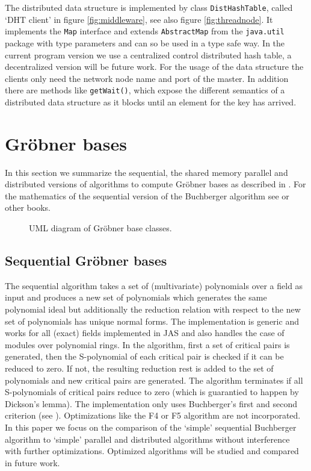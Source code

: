 \documentclass[10pt,twocolumn,a4paper]{article}
\newcommand{\code}[1]{\texttt{#1}}
\begin{document}
The distributed data structure is implemented by class
\code{Dist\-Hash\-Table}, called `DHT client' in figure
\ref{fig:middleware}, see also figure \ref{fig:threadnode}. It
implements the \code{Map} interface and extends \code{Abs\-tract\-Map}
from the \code{java.util} package with type parameters and can so be
used in a type safe way. In the current program version we use a
centralized control distributed hash table, a decentralized version
will be future work.  For the usage of the data structure the clients
only need the network node name and port of the master.  In addition
there are methods like \code{getWait()}, which expose the different
semantics of a distributed data structure as it blocks until an
element for the key has arrived.


\section{Gr\"obner bases} 

In this section we summarize the sequential, the shared memory
parallel and distributed versions of algorithms to compute Gr\"obner
bases as described in \cite{Kredel:2009,Kredel:2010}.  For the
mathematics of the sequential version of the Buchberger algorithm see
\cite{Becker:1993} or other books.


\begin{figure}[thb]
\centering
{}
\caption{UML diagram of Gr\"obner base classes.}
\label{fig:gbase}
\end{figure}


\subsection{Sequential Gr\"obner bases} 

The sequential algorithm takes a set of (multivariate) polynomials
over a field as input and produces a new set of polynomials which
generates the same polynomial ideal but additionally the reduction
relation with respect to the new set of polynomials has unique normal
forms.  The implementation is generic and works for all (exact) fields
implemented in JAS and also handles the case of modules over
polynomial rings.  In the algorithm, first a set of critical pairs is
generated, then the S-polynomial of each critical pair is checked if
it can be reduced to zero. If not, the resulting reduction rest is
added to the set of polynomials and new critical pairs are generated.
The algorithm terminates if all S-polynomials of critical pairs reduce
to zero (which is guarantied to happen by Dickson's lemma).  The
implementation only uses Buchberger's first and second criterion (see
\cite{Becker:1993}). Optimizations like the F4 or F5 algorithm
\cite{GebauerMoeller:1988,GioviniMora:1991,Faugere:1999,Faugere:2002}
are not incorporated. In this paper we focus on the comparison of the
`simple' sequential Buchberger algorithm to `simple' parallel and
distributed algorithms without interference with further
optimizations. Optimized algorithms will be studied and compared in
future work.
\end{document}
